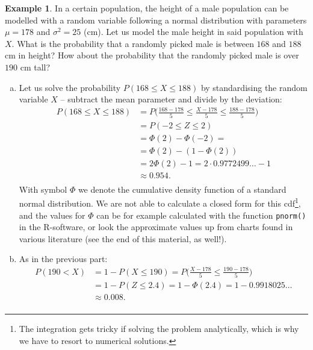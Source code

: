 \documentclass[12pt,a4paper,leqno]{report}
\theoremstyle{plain}
\theoremstyle{definition}
\newtheorem{esim}[equation]{Example}
\begin{document}
\begin{esim} \label{esim:norm_stand}
In a certain population, the height of a male population can be modelled with a random variable following a normal distribution with parameters $\mu = 178$ and $\sigma^2 = 25$ (cm). Let us model the male height in said population with $X$. What is the probability that a randomly picked male is between $168$ and $188$ cm in height? How about the probability that the randomly picked male is over $190$ cm tall?

\begin{enumerate}[(a)]
\item Let us solve the probability $P(168 \leq X \leq 188)$ by standardising the random variable $X$ -- subtract the mean parameter and divide by the deviation:
\[
\begin{split}
P(168 \leq X \leq 188) &= P\Big(\frac{168 - 178}{5} \leq \frac{X - 178}{5} \leq \frac{188 - 178}{5}\Big)  \\
&= P(-2 \leq Z \leq 2) \\
&=\Phi (2) - \Phi (-2) =  \\
&=\Phi(2) - (1- \Phi(2)) \\
&= 2 \Phi(2) - 1 = 2 \cdot 0.9772499\ldots -1 \\
&\approx 0.954. \\									  					  
\end{split}
\]
With symbol $\Phi$ we denote the cumulative density function of a standard normal distribution. We are not able to calculate a closed form for this cdf\footnote{The integration gets tricky if solving the problem analytically, which is why we have to resort to numerical solutions.}, and the values for $\Phi$ can be for example calculated with the function \verb|pnorm()| in the R-software, or look the approximate values up from charts found in various literature (see the end of this material, as well!).  
\item As in the previous part:
\[
\begin{split}
P(190 < X ) &= 1 - P(X \leq 190) = P\Big(\frac{X - 178}{5} \leq \frac{190 - 178}{5}\Big)  \\
&= 1 - P( Z \leq 2.4) = 1 - \Phi (2.4) =  1 - 0.9918025\ldots\\
&\approx 0.008. \\									  					  
\end{split}
\]
\end{enumerate}
\begin{center}

\end{center}
\end{esim}
\end{document}
